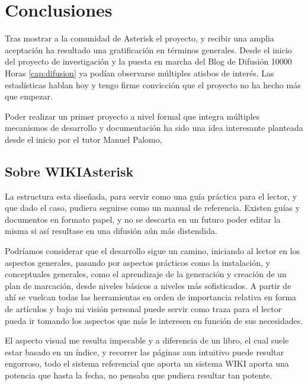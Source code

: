 
\section{Conclusiones}

Tras mostrar a la comunidad de Asterisk el proyecto, y recibir una amplia aceptación ha resultado una gratificación en términos generales. Desde el inicio del proyecto de investigación y la puesta en marcha del Blog de Difusión 10000 Horas \ref{cap:difusion} ya podían observarse múltiples atisbos de interés. Las estadísticas hablan hoy y tengo firme convicción que el proyecto no ha hecho más que empezar.

Poder realizar un primer proyecto a nivel formal que integra múltiples mecanismos de desarrollo y documentación ha sido una idea interesante planteada desde el inicio por el tutor Manuel Palomo, 

\subsection{Sobre WIKIAsterisk}

La estructura esta diseñada, para servir como una guía práctica para el lector, y que dado el caso, pudiera seguirse como un manual de referencia. Existen guías y documentos en formato papel, y no se descarta en un futuro poder editar la misma si así resultase en una difusión aún más distendida.

Podríamos considerar que el desarrollo sigue un camino, iniciando al lector en los aspectos generales, pasando por aspectos prácticos como la instalación, y conceptuales generales, como el aprendizaje de la generación y creación de un plan de marcación, desde niveles básicos a niveles más sofisticados. A partir de ahí se vuelcan todas las herramientas en orden de importancia relativa en forma de artículos y bajo mi visión personal puede servir como traza para el lector pueda ir tomando los aspectos que más le interesen en función de sus necesidades.

El aspecto visual me resulta impecable y a diferencia de un libro, el cual suele estar basado en un índice, y recorrer las páginas aun intuitivo puede resultar engorroso, todo el sistema referencial que aporta un sistema WIKI aporta una potencia que hasta la fecha, no pensaba que pudiera resultar tan potente. 

